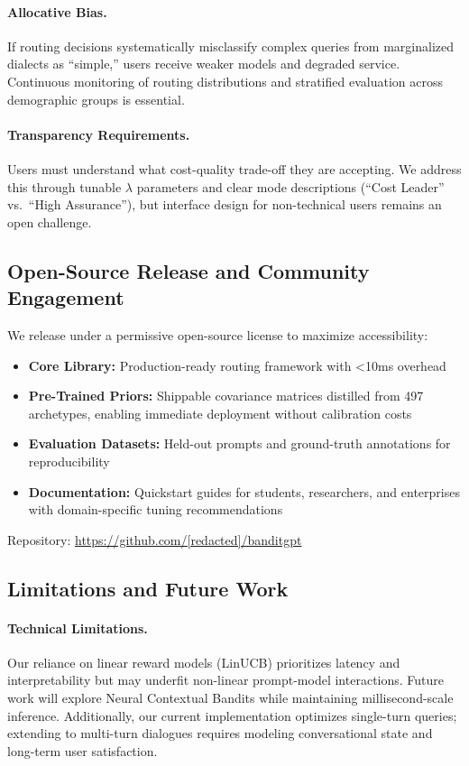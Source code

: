 \paragraph{Allocative Bias.} If routing decisions systematically misclassify complex queries from marginalized dialects as ``simple,'' users receive weaker models and degraded service. Continuous monitoring of routing distributions and stratified evaluation across demographic groups is essential.

\paragraph{Transparency Requirements.} Users must understand what cost-quality trade-off they are accepting. We address this through tunable $\lambda$ parameters and clear mode descriptions (``Cost Leader'' vs.\ ``High Assurance''), but interface design for non-technical users remains an open challenge.

\subsection{Open-Source Release and Community Engagement}

We release \ours{} under a permissive open-source license to maximize accessibility:

\begin{itemize}[leftmargin=*]
    \item \textbf{Core Library:} Production-ready routing framework with <10ms overhead
    \item \textbf{Pre-Trained Priors:} Shippable covariance matrices distilled from 497 archetypes, enabling immediate deployment without calibration costs
    \item \textbf{Evaluation Datasets:} Held-out prompts and ground-truth annotations for reproducibility
    \item \textbf{Documentation:} Quickstart guides for students, researchers, and enterprises with domain-specific tuning recommendations
\end{itemize}

Repository: \url{https://github.com/[redacted]/banditgpt}

\subsection{Limitations and Future Work}

\paragraph{Technical Limitations.}
Our reliance on linear reward models (LinUCB) prioritizes latency and interpretability but may underfit non-linear prompt-model interactions. Future work will explore Neural Contextual Bandits while maintaining millisecond-scale inference. Additionally, our current implementation optimizes single-turn queries; extending to multi-turn dialogues requires modeling conversational state and long-term user satisfaction.

